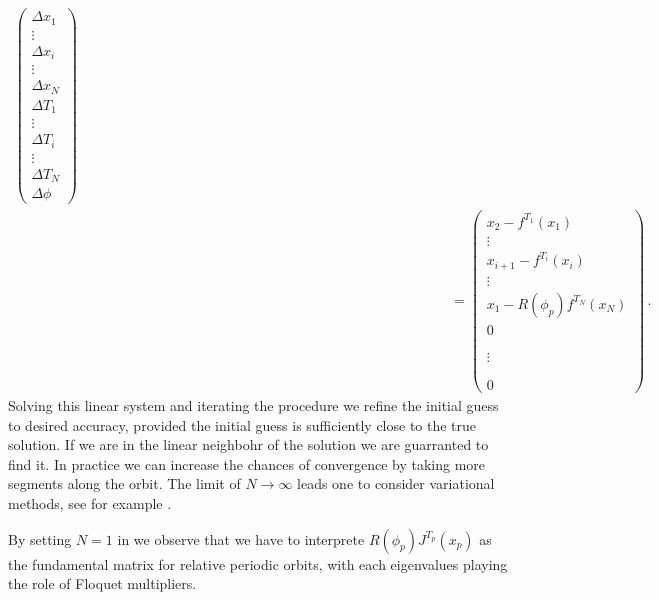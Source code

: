 \begin{eqnarray*}
{     \left(\begin{array}{c}
        \Delta x_1 \\
	\vdots\\
	\Delta x_i \\
	\vdots\\
	\Delta x_N \\
        \Delta T_1 \\
	\vdots	\\
	\Delta T_i \\
	\vdots	\\
	\Delta T_N \\	
	\Delta \phi
     \end{array}\right)}\\%
     & & 
     \hspace{300pt}=\left(\begin{array}{c}
	x_2-f^{T_1}(x_1)\\
	\vdots\\	
        x_{i+1}-f^{T_i}(x_i) \\
	\vdots\\
	x_{1}-R(\phi_p)f^{T_N}(x_N)\\
       	0    \\
	\\
	\\
	\vdots\\
	\\
	\\
	0
     \end{array}\right)\,.
     \label{eq:NewtonScheme}
\end{eqnarray*}
\normalsize
Solving this linear system and iterating the procedure we refine the initial guess to desired accuracy,
provided the initial guess is sufficiently close to the true solution. If we are in the linear neighbohr
of the solution we are guarranted to find it. In practice we can increase the chances of convergence 
by taking more segments along the orbit. The limit of $N\rightarrow\infty$ leads one to consider
variational methods, see for example .

By setting $N=1$ in  we observe that we have to interprete $R(\phi_p)J^{T_p}(x_p)$
as the fundamental matrix for relative periodic orbits, with each eigenvalues playing the role
of Floquet multipliers.

